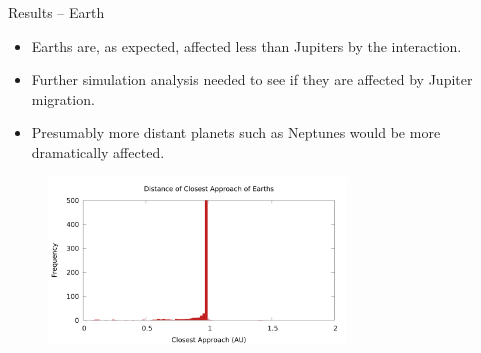 \documentclass{beamer}
\begin{document}
\begin{frame}{Results -- Earth}
    \begin{itemize}
        \item Earths are, as expected, affected less than Jupiters by the interaction.
        \item Further simulation analysis needed to see if they are affected by Jupiter
            migration.
        \item Presumably more distant planets such as Neptunes would be more dramatically
            affected.
    \end{itemize}
    \begin{figure}
        \centering
        \includegraphics[height=1.75in]{earth_distance_final}
    \end{figure}
\end{frame}
\end{document}
